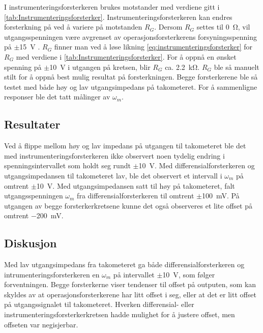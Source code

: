 I instrumenteringsforsterkeren brukes motstander med verdiene gitt i \autoref{tab:Instrumenteringsforsterker}. Instrumenteringsforsterkeren kan endres forsterkning på ved å variere på motstanden $R_G$. 
Dersom $R_G$ settes til {\SI{0}{\ohm}}, vil utgangsspenningen være avgrenset av operasjonsforsterkerens forsyningsspenning på $\pm${\SI{15}{\volt}} . 
$R_G$ finner man ved å løse likning \eqref{eq:instrumenteringsforsterker} for $R_G$ med verdiene i \autoref{tab:Instrumenteringsforsterker}. For å oppnå en ønsket spenning på $\pm${\SI{10}{\volt}} i utgangen på kretsen, blir $R_G$ ca. {\SI{2.2}{\kilo\ohm}}. $R_G$ ble så manuelt stilt for å oppnå best mulig resultat på forsterkningen. Begge forsterkerene ble så testet med både høy og lav utgangsimpedans på takometeret. For å sammenligne responser ble det tatt målinger av $\omega_m$.







\subsection{Resultater}

Ved å flippe mellom høy og lav impedans på utgangen til takometeret ble det med instrumenteringsforsterkeren ikke observert noen tydelig endring i spenningsintervallet som holdt seg rundt $\pm${\SI{10}{\volt}}. 
Med differensialforsterkeren og utgangsimpedansen til takometeret lav, ble det observert et intervall i $\omega_m$ på omtrent $\pm${\SI{10}{\volt}}. Med utgangsimpedansen satt til høy på takometeret, falt utgangsspenningen $\omega_m$ fra differensialforsterkeren til omtrent $\pm${\SI{100}{\milli\volt}}.
På utgangen av begge forsterkerkretsene kunne det også observeres et lite offset på omtrent $-${\SI{200}{\milli\volt}}.






\subsection{Diskusjon}

Med lav utgangsimpedans fra takometeret ga både differensialforsterkeren og intrumenteringsforsterkeren en $\omega_m$ på intervallet $\pm${\SI{10}{\volt}}, som følger forventningen.
Begge forsterkerne viser tendenser til offset på outputen, som kan skyldes av at operasjonsforsterkerene har litt offset i seg, eller at det er litt offset på utgangssignalet til takometeret. 
Hverken differensial- eller instrumenteringsforsterkerkretsen hadde mulighet for å justere offset, men offseten var negisjerbar.

